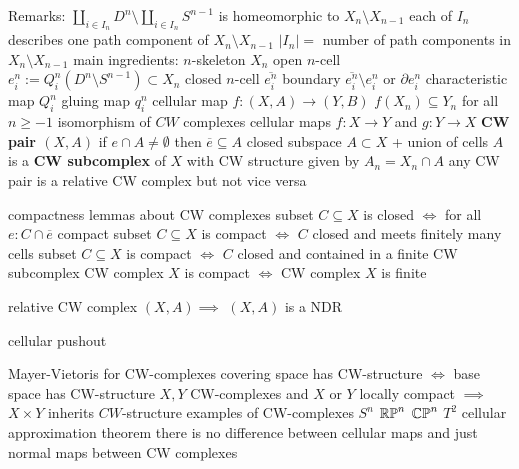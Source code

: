 \begin{outline}
    \1 Remarks:
        \2 $\coprod\limits_{i\in I_n} D^{n} \setminus\coprod\limits_{i\in I_n} S^{n-1}$ is homeomorphic to $X_n\setminus X_{n-1}$
            \3 each of $I_n$ describes one path component of $X_n\setminus X_{n-1}$
            \3 $|I_n| = $ number of path components in $X_n\setminus X_{n-1}$
        \2 main ingredients:
            \3 $n$-skeleton $X_n$
            \3 open $n$-cell $e^n_i:=Q^n_i(D^n\setminus S^{n-1})\subset X_n$
            \3 closed $n$-cell $\overline{e^n_i}$
            \3 boundary $\overline{e^n_i}\setminus e^n_i$ or $\partial e^n_i$
            \3 characteristic map $Q^n_i$
            \3 gluing map $q^n_i$
    \1 cellular map $f:(X,A)\rightarrow (Y,B)$
        \2 $f(X_n)\subseteq Y_n$ for all $n\geq -1$
    \1 isomorphism of $CW$ complexes 
        \2 cellular maps $f:X\rightarrow Y$ and $g:Y\rightarrow X$
    \1 \textbf{CW pair $(X,A)$}
        \2 if $e\cap A \neq \emptyset$ then $\overline{e}\subseteq A$
        \2 closed subspace $A\subset X$ + union of cells
        \2 $A$ is a \textbf{CW subcomplex} of $X$ with CW structure given by $A_n=X_n\cap A$
        \2 any CW pair is a relative CW complex but not vice versa
        
        
    \1 compactness lemmas about CW complexes
        \2 subset $C\subseteq X$ is closed $\iff$ for all $e: C\cap \overline{e}$ compact 
        \2 subset $C\subseteq X$ is compact $\iff$ $C$ closed and meets finitely many cells
        \2 subset $C\subseteq X$ is compact $\iff$ $C$ closed and contained in a finite CW subcomplex
        \2 CW complex $X$ is compact $\iff$ CW complex $X$ is finite

    \1 relative CW complex $(X,A) \implies $ $(X,A)$ is a NDR 

    \1 cellular pushout 


    \1 Mayer-Vietoris for CW-complexes
    \1 covering space has CW-structure $\iff$ base space has CW-structure
    \1 $X,Y$ CW-complexes and $X$ or $Y$ locally compact $\implies$ $X\times Y$ inherits $CW$-structure
    \1 examples of CW-complexes
        \2 $S^n$
        \2 $\mathbb{RP}^n$
        \2 $\mathbb{CP}^n$
        \2 $T^2$
    \1 cellular approximation theorem
        \2 there is no difference between cellular maps and just normal maps between CW complexes
\end{outline}

